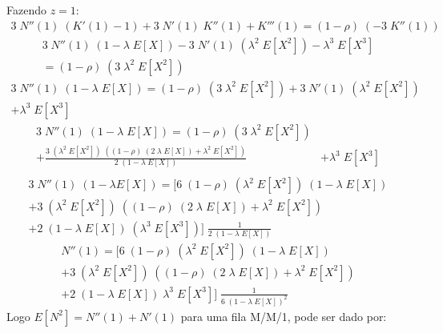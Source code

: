 \documentclass[a4paper]{article}
\newcommand{\E}[1]{E\!\left[#1\right]}
\begin{document}
Fazendo \(z = 1\):
\begin{align*}
    3 \; N''(1) \; (K'(1) - 1)
        + 3 \; N'(1) \; K''(1) + K'''(1)
        = (1 - \rho) \; (-3 \; K''(1))
\end{align*} \begin{align*}
    3 \; N''(1) \; (1 - \lambda \; \E{X})
        - 3 \; N'(1) \; (\lambda^2 \; \E{X^2})
        - \lambda^3 \; \E{X^3} \\
        = (1 - \rho) \; (3 \; \lambda^2 \; \E{X^2})
\end{align*} \begin{align*}
    3 \; N''(1) \; (1 - \lambda \; \E{X})
        = (1 - \rho) \; (3 \; \lambda^2 \; \E{X^2})
        + 3 \; N'(1) \; (\lambda^2 \; \E{X^2}) \\
        + \lambda^3 \; \E{X^3}
\end{align*} \begin{align*}
    3 \; N''(1) \; (1 - \lambda \; \E{X})
        = (1 - \rho) \; (3 \; \lambda^2 \; \E{X^2}) \\
        + \frac{3 \; (\lambda^2 \; \E{X^2}) \;
            ((1 - \rho) \; (2 \; \lambda \; \E{X})
        + \lambda^2 \; \E{X^2})}{2 \; (1 - \lambda \; \E{X})}
        &+ \lambda^3 \; \E{X^3} \\
\end{align*} \begin{align*}
    3 \; N''(1) \; (1 - \lambda \E{X})
        = \biggl[
            6 \; (1 - \rho) \; (\lambda^2 \; \E{X^2})
                \; (1 - \lambda \; \E{X}) \\
            + 3 \; (\lambda^2 \; \E{X^2}) \; ((1 - \rho)
                \; (2 \; \lambda \; \E{X}) + \lambda^2 \; \E{X^2}) \\
            + 2 \; (1 - \lambda \; \E{X}) \; (\lambda^3 \; \E{X^3})
        \biggr]
        \; \frac{1}{2 \; (1 - \lambda \; \E{X})}
\end{align*} \begin{align*}
    N''(1) = \biggl[
        6 \; (1 - \rho) \; (\lambda^2 \; \E{X^2})
            \; (1 - \lambda \; \E{X}) \\
        + 3 \; (\lambda^2 \; \E{X^2})
            \; ((1 - \rho) \; (2 \; \lambda \; \E{X})
        + \lambda^2 \; \E{X^2}) \\
        + 2 \; (1 - \lambda \; \E{X}) \; \lambda^3 \; \E{X^3}
    \biggr]
    \; \frac{1}{6 \; (1 - \lambda \; \E{X})^2}
\end{align*}
Logo \(\E{N^2} = N''(1) + N'(1)\)
para uma fila M/M/1, pode ser dado por:
\end{document}

